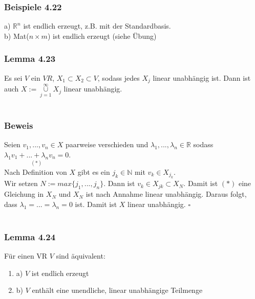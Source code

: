 \documentclass{article}
\begin{document}
\subsubsection*{Beispiele 4.22}
a) $\mathbb{R}^n$ ist endlich erzeugt, z.B. mit der Standardbasis. \\
b) Mat($n \times m$) ist endlich erzeugt (siehe Übung)
\\
\subsubsection*{Lemma 4.23}
Es sei $V$ ein $VR$, $X_1 \subset X_2 \subset V$, sodass jedes $X_j$ linear unabhängig ist. Dann ist auch $X := \underset{j = 1}{\overset{\infty}{\cup}} X_j$ linear unabhängig. \\
\\
\subsubsection*{Beweis}
Seien $v_1,...,v_n \in X$ paarweise verschieden und $\lambda_1,...,\lambda_n \in \mathbb{R}$ sodass $\underset{(*)}{\lambda_1 v_1 + ... + \lambda_n v_n = 0}$. \\
Nach Definition von $X$ gibt es ein $j_k \in \mathbb{N}$ mit $v_k \in X_{j_k}$. \\
Wir setzen $N := max\{j_1,...,j_n\}$. Dann ist $v_k \in X_{jk} \subset X_N$.
Damit ist $(*)$ eine Gleichung in $X_N$ und $X_N$ ist nach Annahme linear unabhängig. Daraus folgt, dass $\lambda_1 = ... = \lambda_n = 0$ ist. Damit ist $X$ linear unabhängig. $\square$ \\
\\
\subsubsection*{Lemma 4.24}
Für einen VR $V$ sind äquivalent: \\
\begin{enumerate}
    \item a) $V$ ist endlich erzeugt \\
    \item b) $V$ enthält eine unendliche, linear unabhängige Teilmenge \\
\end{enumerate}
\end{document}
